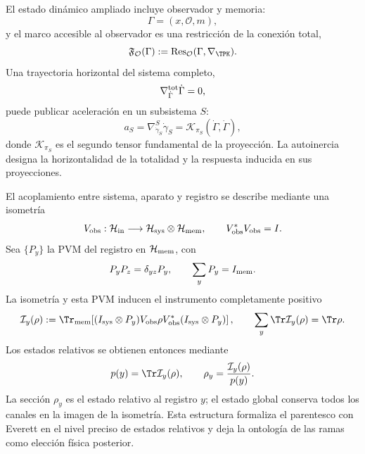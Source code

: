 El estado din\'amico ampliado incluye observador y memoria:
\begin{equation}
 \Gamma=(x,\mathcal O,m),
 \label{eq:descendant-observer-state}
\end{equation}
y el marco accesible al observador es una restricci\'on de la conexi\'on total,
\begin{equation}
 \mathfrak F_{\mathcal O}(\Gamma)
 :=\operatorname{Res}_{\mathcal O}
 (\Gamma,\nabla_{\TPK}).
 \label{eq:descendant-observer-frame}
\end{equation}
Una trayectoria horizontal del sistema completo,
\begin{equation}
 \nabla^{\rm tot}_{\dot\Gamma}\dot\Gamma=0,
 \label{eq:descendant-total-horizontal}
\end{equation}
puede publicar aceleraci\'on en un subsistema \(S\):
\begin{equation}
 a_S=\nabla^S_{\dot\gamma_S}\dot\gamma_S
 =\mathcal K_{\pi_S}(\dot\Gamma,\dot\Gamma),
 \label{eq:descendant-projected-acceleration}
\end{equation}
donde \(\mathcal K_{\pi_S}\) es el segundo tensor fundamental de la
proyecci\'on. La autoinercia designa la horizontalidad de la totalidad y la
respuesta inducida en sus proyecciones.

El acoplamiento entre sistema, aparato y registro se describe mediante una
isometr\'ia
\begin{equation}
 V_{\rm obs}:\mathcal H_{\rm in}\longrightarrow
 \mathcal H_{\rm sys}\otimes\mathcal H_{\rm mem},
 \qquad
 V_{\rm obs}^*V_{\rm obs}=I.
 \label{eq:descendant-observer-isometry}
\end{equation}
Sea \(\{P_y\}\) la PVM del registro en \(\mathcal H_{\rm mem}\), con
\begin{equation}
 P_yP_z=\delta_{yz}P_y,
 \qquad
 \sum_yP_y=I_{\rm mem}.
 \label{eq:descendant-observer-PVM}
\end{equation}
La isometr\'ia y esta PVM inducen el instrumento completamente positivo
\begin{equation}
 \mathcal I_y(\rho)
 :=\Tr_{\rm mem}\!\left[
 (I_{\rm sys}\otimes P_y)V_{\rm obs}\rho V_{\rm obs}^*
 (I_{\rm sys}\otimes P_y)
 \right],
 \qquad
 \sum_y\Tr\mathcal I_y(\rho)=\Tr\rho.
 \label{eq:descendant-observer-instrument}
\end{equation}
Los estados relativos se obtienen entonces mediante
\begin{equation}
 p(y)=\Tr\mathcal I_y(\rho),
 \qquad
 \rho_y=\frac{\mathcal I_y(\rho)}{p(y)}.
 \label{eq:descendant-relative-state}
\end{equation}
La secci\'on \(\rho_y\) es el estado relativo al registro \(y\); el estado
global conserva todos los canales en la imagen de la isometr\'ia. Esta
estructura formaliza el parentesco con Everett en el nivel preciso de
estados relativos y deja la ontolog\'ia de las ramas como elecci\'on f\'isica
posterior.

